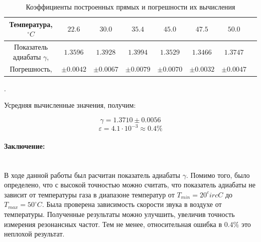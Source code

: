 \documentclass[a4paper, 12pt]{article}
\newcommand{\parag}[1]{\paragraph*{#1:}}
\newcounter{Points}
\newcommand{\point}{\arabic{Points}. \addtocounter{Points}{1}}
\begin{document}
\begin{table}[h]
    \centering
    \small
    \setlength\tabcolsep{3pt}
    \begin{tabular}{|c|c|c|c|c|c|c|c|}
    \hline 
    Температура, $^\circ C$ & $22.6$ & $30.0$ & $35.4$ & $45.0$ & $47.5$ & $50.0$ \\ \hline
    Показатель адиабаты $\gamma$, & $1.3596$ & $1.3928$ & $1.3994$ & $1.3529$ & $1.3466$ & $1.3747$ \\ \hline
    Погрешность, & $\pm 0.0042$ & $\pm 0.0067$ & $\pm 0.0079$ & $\pm 0.0070$ & $\pm 0.0032$ & $\pm 0.0047$ \\ \hline
    \end{tabular}
	\caption{Коэффициенты построенных прямых и погрешности их вычисления}
    \label{tabl:gammas}
\end{table}

\point Усредняя вычисленные значения, получим:

$$\gamma = 1.3710 \pm 0.0056$$
$$\varepsilon = 4.1 \cdot 10^{-3} \approx 0.4\%$$

\parag {Заключение} ~\\
    В ходе данной работы был расчитан показатель адиабаты $\gamma$. Помимо того, было определено, что с высокой точностью можно считать, что показатель адиабаты не зависит от температуры газа в диапазоне температур от $T_{min} = 20^circ C$ до $T_{max} = 50^\circ C$. Была проверена зависимость скорости звука в воздухе от температуры. Полученные результаты можно улучшить, увеличив точность измерения резонансных частот. Тем не менее, относительная ошибка в $0.4\%$ это неплохой результат.
\end{document}
